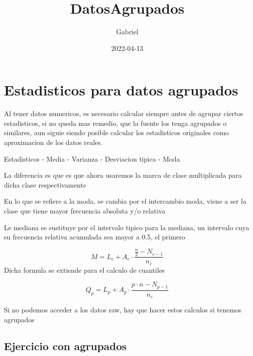 \documentclass[
]{article}
\title{DatosAgrupados}
\author{Gabriel}
\date{2022-04-13}
\begin{document}
\maketitle

\hypertarget{estadisticos-para-datos-agrupados}{%
\section{Estadisticos para datos
agrupados}\label{estadisticos-para-datos-agrupados}}

Al tener datos numericos, es necesario calcular siempre antes de agrupar
ciertos estadisticos, si no queda mas remedio, que la fuente los tenga
agrupados o similares, aun siguie siendo posible calcular los
estadisticos originales como aproximacion de los datos reales.

Estadisticos - Media - Varianza - Desviacion tipica - Moda

La diferencia es que es que ahora usaremos la marca de clase
multiplicada para dicha clase respectivamente

En lo que se refiere a la moda, se cambia por el intercambio moda, viene
a ser la clase que tiene mayor frecuencia absoluta y/o relativa

Le mediana se sustituye por el intervalo tipico para la mediana, un
intervalo cuya su frecuencia relativa acumulada sea mayor a 0.5, el
primero

\[M = L_c + A_c \cdot \frac{\frac{n}{2}-N_{c-1}}{n_c}\] Dicha formula se
extiende para el calculo de cuantiles

\[Q_p = L_p + A_p \cdot \frac{p\cdot n - N_{p-1}}{n_c}\]

Si no podemos acceder a los datos raw, hay que hacer estos calculos si
tenemos agrupados

\hypertarget{ejercicio-con-agrupados}{%
\subsection{Ejercicio con agrupados}\label{ejercicio-con-agrupados}}
\end{document}
